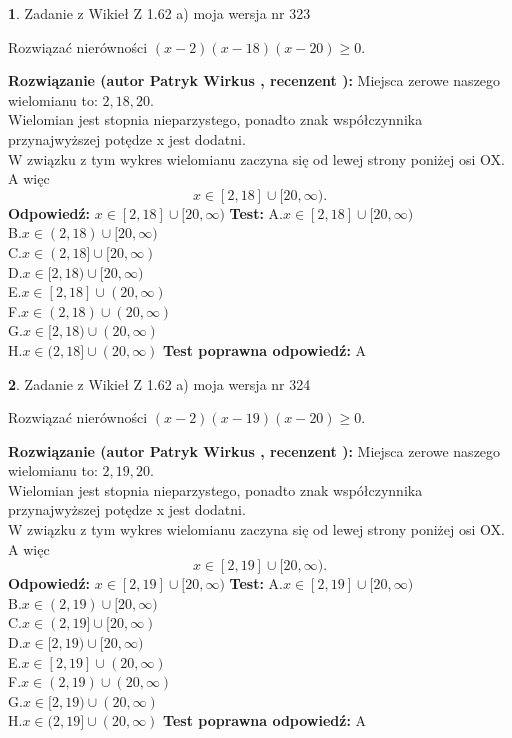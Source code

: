 \documentclass[12pt, a4paper]{article}
\theoremstyle{definition} %
\newtheorem{zad}{}
\newcommand{\zadStart}[1]{\begin{zad}#1\newline}
\newcommand{\zadStop}{\end{zad}}
\newcommand{\rozwStart}[2]{\noindent \textbf{Rozwiązanie (autor #1 , recenzent #2): }\newline}
\newcommand{\rozwStop}{\newline}
\newcommand{\odpStart}{\noindent \textbf{Odpowiedź:}\newline}
\newcommand{\odpStop}{\newline}
\newcommand{\testStart}{\noindent \textbf{Test:}\newline}
\newcommand{\testStop}{\newline}
\newcommand{\kluczStart}{\noindent \textbf{Test poprawna odpowiedź:}\newline}
\newcommand{\kluczStop}{\newline}
\begin{document}
\zadStart{Zadanie z Wikieł Z 1.62 a) moja wersja nr 323}

Rozwiązać nierówności $(x-2)(x-18)(x-20)\ge0$.
\zadStop
\rozwStart{Patryk Wirkus}{}
Miejsca zerowe naszego wielomianu to: $2, 18, 20$.\\
Wielomian jest stopnia nieparzystego, ponadto znak współczynnika przy\linebreak najwyższej potędze x jest dodatni.\\ W związku z tym wykres wielomianu zaczyna się od lewej strony poniżej osi OX. A więc $$x \in [2,18] \cup [20,\infty).$$
\rozwStop
\odpStart
$x \in [2,18] \cup [20,\infty)$
\odpStop
\testStart
A.$x \in [2,18] \cup [20,\infty)$\\
B.$x \in (2,18) \cup [20,\infty)$\\
C.$x \in (2,18] \cup [20,\infty)$\\
D.$x \in [2,18) \cup [20,\infty)$\\
E.$x \in [2,18] \cup (20,\infty)$\\
F.$x \in (2,18) \cup (20,\infty)$\\
G.$x \in [2,18) \cup (20,\infty)$\\
H.$x \in (2,18] \cup (20,\infty)$
\testStop
\kluczStart
A
\kluczStop



\zadStart{Zadanie z Wikieł Z 1.62 a) moja wersja nr 324}

Rozwiązać nierówności $(x-2)(x-19)(x-20)\ge0$.
\zadStop
\rozwStart{Patryk Wirkus}{}
Miejsca zerowe naszego wielomianu to: $2, 19, 20$.\\
Wielomian jest stopnia nieparzystego, ponadto znak współczynnika przy\linebreak najwyższej potędze x jest dodatni.\\ W związku z tym wykres wielomianu zaczyna się od lewej strony poniżej osi OX. A więc $$x \in [2,19] \cup [20,\infty).$$
\rozwStop
\odpStart
$x \in [2,19] \cup [20,\infty)$
\odpStop
\testStart
A.$x \in [2,19] \cup [20,\infty)$\\
B.$x \in (2,19) \cup [20,\infty)$\\
C.$x \in (2,19] \cup [20,\infty)$\\
D.$x \in [2,19) \cup [20,\infty)$\\
E.$x \in [2,19] \cup (20,\infty)$\\
F.$x \in (2,19) \cup (20,\infty)$\\
G.$x \in [2,19) \cup (20,\infty)$\\
H.$x \in (2,19] \cup (20,\infty)$
\testStop
\kluczStart
A
\kluczStop
\end{document}
